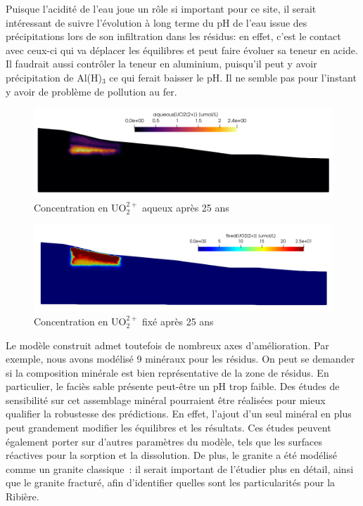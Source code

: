 \documentclass{article}
\newcommand{\blue}[1]{\textcolor{blue}{#1}} %
\begin{document}
Puisque l’acidité de l’eau joue un rôle si important pour ce site, il serait intéressant de suivre l'évolution à long terme du pH de l'eau issue des précipitations lors de son infiltration dans les résidus: en effet, c'est le contact avec ceux-ci qui va déplacer les équilibres et peut faire évoluer sa teneur en acide. Il faudrait aussi contrôler la teneur en aluminium, puisqu’il peut y avoir précipitation de Al(H)$_3$ ce qui ferait baisser le pH. Il ne semble pas pour l’instant y avoir de problème de pollution au fer. 


\begin{figure}[H]
    \centering
    \includegraphics[width=\linewidth]{LJ-UO22P-final.PNG}
    \caption{Concentration en UO$_2^{2+}$ aqueux après 25 ans}
    \label{fig:uo2P-aqueux-final}
\end{figure}

\begin{figure}[H]
    \centering
    \includegraphics[width=\linewidth]{III_B_4_2.png}
    \caption{Concentration en UO$_2^{2+}$ fixé après 25 ans}
    \label{fig:uo2P-fixe-final}
\end{figure}

Le modèle construit admet toutefois de nombreux axes d'amélioration. Par exemple, nous avons modélisé 9 minéraux pour les résidus.
On peut se demander si la composition minérale est bien représentative de la zone de résidus. En particulier, le faciès sable présente peut-être un pH trop faible. Des études de sensibilité sur cet assemblage minéral pourraient être réalisées pour mieux qualifier la robustesse des prédictions.
En effet, l’ajout d’un seul minéral en plus peut grandement modifier les équilibres et les résultats. 
Ces études peuvent également porter sur d’autres paramètres du modèle, tels que les surfaces réactives pour la sorption et la dissolution.
De plus, le granite a été modélisé comme un granite \og classique\fg~: il serait important de l'étudier plus en détail, ainsi que le granite fracturé, afin d'identifier quelles sont les particularités pour la Ribière. 
\end{document}
